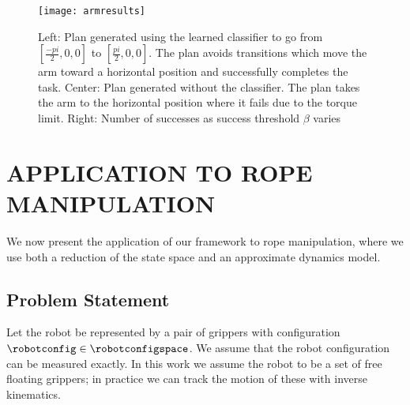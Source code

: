 \begin{figure}[t]
    \vspace{0.02in}
    \centering
    \texttt{[image: armresults]}
    \vspace{-0.1in}
    \caption{Left: Plan generated using the learned classifier to go from $[\frac{-pi}{2}, 0, 0]$ to $[\frac{pi}{2}, 0, 0]$. The plan avoids transitions which move the arm toward a horizontal position and successfully completes the task. Center: Plan generated without the classifier. The plan takes the arm to the horizontal position where it fails due to the torque limit. Right: Number of successes as success threshold $\beta$ varies}
    \label{fig:planar_arm}
\end{figure}







\section{APPLICATION TO ROPE MANIPULATION}


We now present the application of our framework to rope manipulation, where we use both a reduction of the state space and an approximate dynamics model.


\subsection{Problem Statement}


Let the robot be represented by a pair of grippers with configuration $\robotconfig \in \robotconfigspace$. We assume that the robot configuration can be measured exactly. In this work we assume the robot to be a set of free floating grippers; in practice we can track the motion of these with inverse kinematics.

